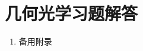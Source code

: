 \documentclass[cn,10pt,chinesefont=founder,math=newtx,cite=super,twoside]{elegantbook}
\begin{document}
%
\appendix
\chapter{几何光学习题解答}
\begin{enumerate}[itemsep=1.5ex]

	\item 备用附录
	
\end{enumerate}
\end{document}
